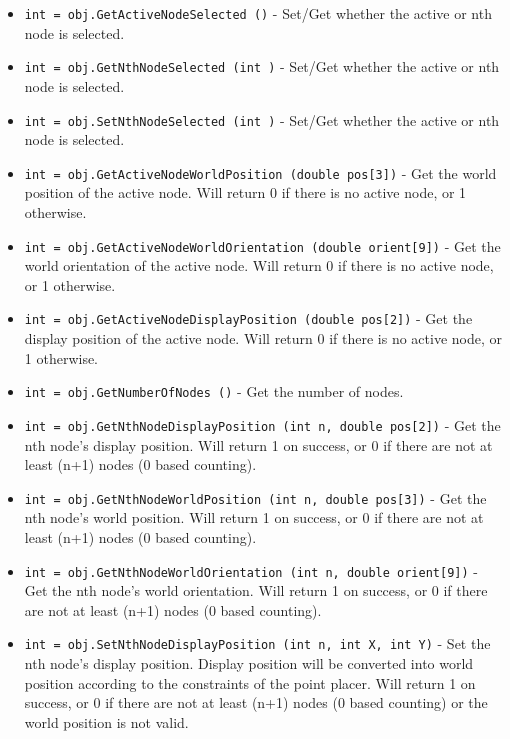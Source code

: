 \begin{itemize}
\item  \verb|int = obj.GetActiveNodeSelected ()| -  Set/Get whether the active or nth node is selected. 

\item  \verb|int = obj.GetNthNodeSelected (int )| -  Set/Get whether the active or nth node is selected. 

\item  \verb|int = obj.SetNthNodeSelected (int )| -  Set/Get whether the active or nth node is selected. 

\item  \verb|int = obj.GetActiveNodeWorldPosition (double pos[3])| -  Get the world position of the active node. Will return
 0 if there is no active node, or 1 otherwise.

\item  \verb|int = obj.GetActiveNodeWorldOrientation (double orient[9])| -  Get the world orientation of the active node. Will return
 0 if there is no active node, or 1 otherwise.  

\item  \verb|int = obj.GetActiveNodeDisplayPosition (double pos[2])| -  Get the display position of the active node. Will return
 0 if there is no active node, or 1 otherwise.

\item  \verb|int = obj.GetNumberOfNodes ()| -  Get the number of nodes.

\item  \verb|int = obj.GetNthNodeDisplayPosition (int n, double pos[2])| -  Get the nth node's display position. Will return
 1 on success, or 0 if there are not at least 
 (n+1) nodes (0 based counting).

\item  \verb|int = obj.GetNthNodeWorldPosition (int n, double pos[3])| -  Get the nth node's world position. Will return
 1 on success, or 0 if there are not at least 
 (n+1) nodes (0 based counting).

\item  \verb|int = obj.GetNthNodeWorldOrientation (int n, double orient[9])| -  Get the nth node's world orientation. Will return
 1 on success, or 0 if there are not at least 
 (n+1) nodes (0 based counting).

\item  \verb|int = obj.SetNthNodeDisplayPosition (int n, int X, int Y)| -  Set the nth node's display position. Display position
 will be converted into world position according to the
 constraints of the point placer. Will return
 1 on success, or 0 if there are not at least 
 (n+1) nodes (0 based counting) or the world position
 is not valid.


\end{itemize}

